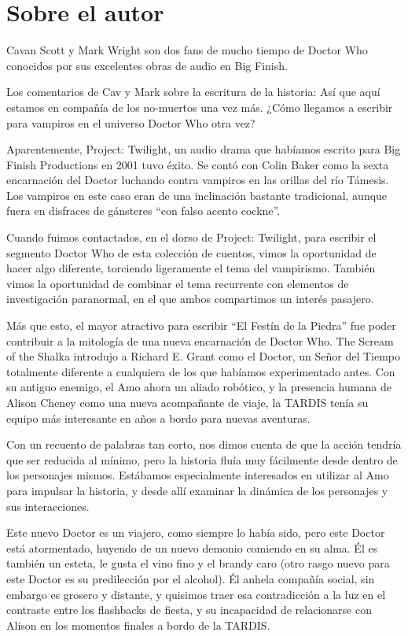 \chapter*{Sobre el autor}

{Cavan Scott y Mark Wright son dos fans de mucho tiempo de Doctor Who conocidos
por sus excelentes obras de audio en Big Finish.}

{Los comentarios de Cav y Mark sobre la escritura de la historia:
 Así que aquí estamos en compañía de los no-muertos una vez más. ¿Cómo llegamos
a escribir para vampiros en el universo Doctor Who otra vez?}

{Aparentemente, Project: Twilight, un audio drama que habíamos escrito para
 Big Finish Productions en 2001 tuvo éxito. Se contó con Colin Baker como la
 sexta encarnación del Doctor luchando contra vampiros en las orillas del río
 Támesis. Los vampiros en este caso eran de una inclinación  bastante
 tradicional, aunque fuera en disfraces de gánsteres
``con falso acento cockne''.}

{Cuando fuimos contactados, en el dorso de Project: Twilight, para escribir el
 segmento Doctor Who de esta colección de cuentos, vimos la oportunidad de
 hacer algo diferente, torciendo ligeramente el tema del vampirismo. También
 vimos la oportunidad de combinar el tema recurrente con elementos de
investigación paranormal, en el que ambos compartimos un interés pasajero.}

{ Más que esto, el mayor atractivo para escribir ``El Festín de la Piedra'' fue
 poder contribuir a la mitología de una nueva encarnación de Doctor Who. The
 Scream of the Shalka introdujo a Richard E. Grant como el Doctor, un Señor del
 Tiempo totalmente diferente a cualquiera de los que habíamos experimentado
 antes. Con su antiguo enemigo, el Amo ahora un aliado robótico, y la presencia
 humana de Alison Cheney como una nueva acompañante de viaje, la TARDIS tenía
su equipo más interesante en años a bordo para nuevas aventuras.}

{Con un recuento de palabras tan corto, nos dimos cuenta de que la acción
 tendría que ser reducida al mínimo, pero la historia fluía muy fácilmente
 desde dentro de los personajes mismos. Estábamos especialmente interesados en
 utilizar al Amo para impulsar la historia, y desde allí examinar la dinámica
de los personajes y sus interacciones.}

{ Este nuevo Doctor es un viajero, como siempre lo había sido, pero este Doctor
 está atormentado, huyendo de un nuevo demonio comiendo en su alma. Él es
 también un esteta, le gusta el vino fino y el brandy caro (otro rasgo nuevo
 para este Doctor es su predilección por el alcohol). Él anhela compañía
 social, sin embargo es grosero y distante, y quisimos traer esa contradicción
 a la luz en el contraste entre los flashbacks de fiesta, y su incapacidad de
relacionarse con Alison en los momentos finales a bordo de la TARDIS.}

